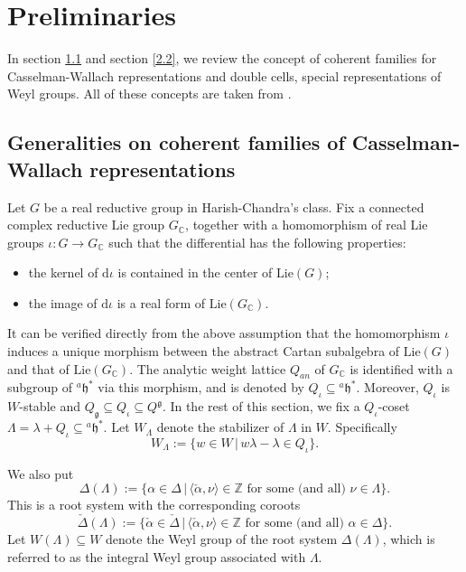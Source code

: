 \documentclass[12pt, a4paper]{amsart}
\numberwithin{equation}{section}
\newcommand{\BC}{{\mathbb {C}}}
\newcommand{\BZ}{{\mathbb {Z}}}
\newcommand{\fg}{\mathfrak{g}}
\newcommand{\fh}{\mathfrak{h}}
\newcommand{\Lie}{{\mathrm{Lie}}}
\newcommand{\set}[2]{\{#1\,|\,#2\}}
\begin{document}
\section{Preliminaries}

In section \ref{2.1} and section \ref{2.2}, we review the concept of coherent families for Casselman-Wallach representations and double cells, special representations of Weyl groups. All of these concepts are taken from \cite[Chapter 4]{BMSZ}.

\subsection{Generalities on coherent families of Casselman-Wallach representations}\label{2.1}
Let $G$ be a real reductive group in Harish-Chandra's class. Fix a connected complex reductive Lie group $G_\BC$, together with a homomorphism of real Lie groups $\iota: G \to G_\BC$ such that the differential has the following properties:
\begin{itemize}
   \item the kernel of $\mathrm{d}\iota$ is contained in the center of $\mathrm{Lie}(G)$;
   \item the image of $\mathrm{d}\iota$ is a real form of $\mathrm{Lie}(G_\BC)$.
\end{itemize}
It can be verified directly from the above assumption that the homomorphism $\iota$ induces a unique morphism between the abstract Cartan subalgebra of $\Lie(G)$ and that of $\Lie(G_{\BC})$. The analytic weight lattice $Q_{an}$ of $G_\BC$ is identified with a subgroup of ${^{a}\fh^*}$ via this morphism, and is denoted by $Q_{\iota} \subseteq  {^{a}\fh^*}$. Moreover, $Q_{\iota}$ is $W$-stable and $Q_{\fg} \subseteq Q_{\iota} \subseteq Q^{\fg}$. In the rest of this section, we fix a $Q_{\iota}$-coset $\Lambda = \lambda + Q_{\iota} \subseteq {^a\fh^*}$. Let $W_{\Lambda}$ denote the stabilizer of $\Lambda$ in $W$. Specifically 
$$W_{\Lambda} := \set{w \in W}{w\lambda - \lambda \in Q_{\iota}}.$$

We also put 
\begin{equation}
    \Delta(\Lambda) := \set{\alpha \in \Delta}{\textrm{$\langle \check{\alpha} , \nu \rangle \in \BZ$ for some (and all) $\nu \in \Lambda$}}.
\end{equation}
This is a root system with the corresponding coroots 
\begin{equation}
    \check{\Delta}(\Lambda) := \set{\check{\alpha} \in \check{\Delta}}{\textrm{$\langle \check{\alpha}, \nu \rangle \in \BZ$ for some (and all) $\alpha \in \Delta$}}.
\end{equation}
Let $W(\Lambda) \subseteq W$ denote the Weyl group of the root system $\Delta(\Lambda)$, which is referred to as the integral Weyl group associated with $\Lambda$.
\end{document}
